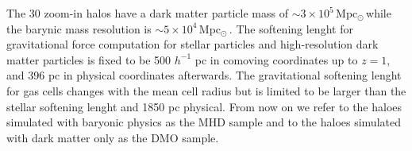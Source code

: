 \documentclass[a4paper,fleqn,usenatbib]{mnras}
\newcommand{\Msun}{\,{\rm Mpc}$_{\odot}$\,}
\begin{document}
The 30 zoom-in halos have a dark matter particle mass of $\sim 3\times
10^5$\Msun while the barynic mass resolution is $\sim 5\times 10^4$\Msun.
The softening lenght for gravitational force computation for stellar
particles and high-resolution dark matter particles 
is fixed to be 500 $h^{-1}$ pc in comoving coordinates up to $z=1$,
and 396 pc in physical coordinates afterwards.
The gravitational softening lenght for gas cells changes with the mean
cell radius but is limited to be larger than the stellar softening
lenght and 1850 pc physical. 
From now on we refer to the haloes simulated with baryonic physics as the
MHD sample and to the haloes simulated with dark matter only as the
DMO sample.


\begin{figure}
  \centering
  \hfill
  \hfill 


\end{figure}
\end{document}
